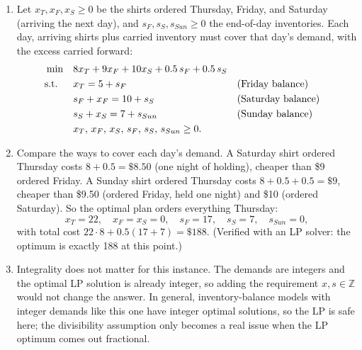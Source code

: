 \begin{enumerate}
\item Let $x_T, x_F, x_S \geq 0$ be the shirts ordered Thursday, Friday, and Saturday (arriving the next day), and $s_F, s_S, s_{Sun} \geq 0$ the end-of-day inventories. Each day, arriving shirts plus carried inventory must cover that day's demand, with the excess carried forward:
\begin{align*}
\min \quad & 8x_T + 9x_F + 10x_S + 0.5\,s_F + 0.5\,s_S\\
\text{s.t.}\;\; \quad & x_T = 5 + s_F && \text{(Friday balance)}\\
& s_F + x_F = 10 + s_S && \text{(Saturday balance)}\\
& s_S + x_S = 7 + s_{Sun} && \text{(Sunday balance)}\\
& x_T,\, x_F,\, x_S,\, s_F,\, s_S,\, s_{Sun} \geq 0.
\end{align*}
\item Compare the ways to cover each day's demand. A Saturday shirt ordered Thursday costs $8 + 0.5 = \$8.50$ (one night of holding), cheaper than \$9 ordered Friday. A Sunday shirt ordered Thursday costs $8 + 0.5 + 0.5 = \$9$, cheaper than \$9.50 (ordered Friday, held one night) and \$10 (ordered Saturday). So the optimal plan orders everything Thursday:
\[
x_T = 22, \quad x_F = x_S = 0, \quad s_F = 17, \quad s_S = 7, \quad s_{Sun} = 0,
\]
with total cost $22 \cdot 8 + 0.5(17 + 7) = \$188$. (Verified with an LP solver: the optimum is exactly 188 at this point.)
\item Integrality does not matter for this instance. The demands are integers and the optimal LP solution is already integer, so adding the requirement $x, s \in \mathbb{Z}$ would not change the answer. In general, inventory-balance models with integer demands like this one have integer optimal solutions, so the LP is safe here; the divisibility assumption only becomes a real issue when the LP optimum comes out fractional.
\end{enumerate}

